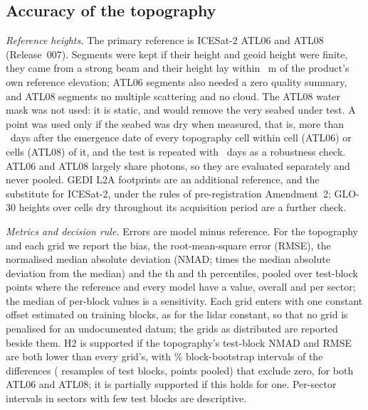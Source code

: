 \subsection*{Accuracy of the topography}
\emph{Reference heights.} The primary reference is ICESat-2 ATL06 and ATL08 (Release~007)\citep{atl06_v7,atl08_v7,markus2017}. Segments were kept if their height and geoid height were finite, they came from a strong beam and their height lay within ~m of the product's own reference elevation; ATL06 segments also needed a zero quality summary, and ATL08 segments no multiple scattering and no cloud. The ATL08 water mask was not used: it is static, and would remove the very seabed under test. A point was used only if the seabed was dry when measured, that is, more than ~days after the emergence date of every topography cell within  cell (ATL06) or  cells (ATL08) of it, and the test is repeated with ~days as a robustness check. ATL06 and ATL08 largely share photons, so they are evaluated separately and never pooled. GEDI L2A footprints\citep{gedi_l2a_v2} are an additional reference, and the substitute for ICESat-2, under the rules of pre-registration Amendment~2; GLO-30 heights over cells dry throughout its acquisition period are a further check.

\emph{Metrics and decision rule.} Errors are model minus reference. For the topography and each grid we report the bias, the root-mean-square error (RMSE), the normalised median absolute deviation (NMAD;  times the median absolute deviation from the median) and the th and th percentiles, pooled over test-block points where the reference and every model have a value, overall and per sector; the median of per-block values is a sensitivity. Each grid enters with one constant offset estimated on training blocks, as for the lidar constant, so that no grid is penalised for an undocumented datum; the grids as distributed are reported beside them. H2 is supported if the topography's test-block NMAD and RMSE are both lower than every grid's, with \% block-bootstrap intervals of the differences ( resamples of test blocks, points pooled) that exclude zero, for both ATL06 and ATL08; it is partially supported if this holds for one. Per-sector intervals in sectors with few test blocks are descriptive.

